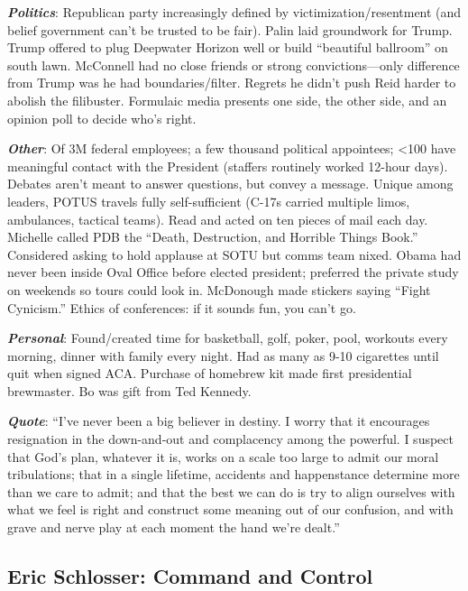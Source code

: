 \documentclass[
]{article}
\begin{document}
\textbf{\emph{Politics}}: Republican party increasingly defined by
victimization/resentment (and belief government can't be trusted to be
fair). Palin laid groundwork for Trump. Trump offered to plug Deepwater
Horizon well or build ``beautiful ballroom'' on south lawn. McConnell
had no close friends or strong convictions---only difference from Trump
was he had boundaries/filter. Regrets he didn't push Reid harder to
abolish the filibuster. Formulaic media presents one side, the other
side, and an opinion poll to decide who's right.

\textbf{\emph{Other}}: Of 3M federal employees; a few thousand political
appointees; \textless100 have meaningful contact with the President
(staffers routinely worked 12-hour days). Debates aren't meant to answer
questions, but convey a message. Unique among leaders, POTUS travels
fully self-sufficient (C-17s carried multiple limos, ambulances,
tactical teams). Read and acted on ten pieces of mail each day. Michelle
called PDB the ``Death, Destruction, and Horrible Things Book.''
Considered asking to hold applause at SOTU but comms team nixed. Obama
had never been inside Oval Office before elected president; preferred
the private study on weekends so tours could look in. McDonough made
stickers saying ``Fight Cynicism.'' Ethics of conferences: if it sounds
fun, you can't go.

\textbf{\emph{Personal}}: Found/created time for basketball, golf,
poker, pool, workouts every morning, dinner with family every night. Had
as many as 9-10 cigarettes until quit when signed ACA. Purchase of
homebrew kit made first presidential brewmaster. Bo was gift from Ted
Kennedy.

\textbf{\emph{Quote}}: ``I've never been a big believer in destiny. I
worry that it encourages resignation in the down-and-out and complacency
among the powerful. I suspect that God's plan, whatever it is, works on
a scale too large to admit our moral tribulations; that in a single
lifetime, accidents and happenstance determine more than we care to
admit; and that the best we can do is try to align ourselves with what
we feel is right and construct some meaning out of our confusion, and
with grave and nerve play at each moment the hand we're dealt.''

\hypertarget{eric-schlosser-command-and-control}{%
\subsection{Eric Schlosser: Command and
Control}\label{eric-schlosser-command-and-control}}
\end{document}
